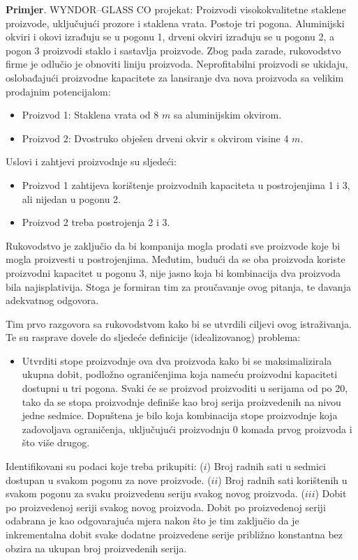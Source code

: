 \documentclass[a4paper, utf8, 11pt, colorlinks]{article}
\begin{document}
\textbf{Primjer}. WYNDOR--GLASS CO projekat: Proizvodi visokokvalitetne staklene proizvode, uključujući prozore i staklena vrata. Postoje tri pogona. Aluminijski okviri i okovi izrađuju se u pogonu 1, drveni okviri izrađuju se u pogonu 2, a pogon 3 proizvodi staklo i sastavlja proizvode.
Zbog pada zarade, rukovodstvo firme je odlučio je obnoviti liniju proizvoda. Neprofitabilni proizvodi se ukidaju, oslobađajući proizvodne kapacitete za lansiranje dva nova proizvoda sa velikim prodajnim potencijalom:
\begin{itemize}
    \item Proizvod 1: Staklena vrata od 8 $m$ sa aluminijskim okvirom.
    \item Proizvod 2: Dvostruko obješen drveni okvir s okvirom visine 4 $m$.
\end{itemize}
Uslovi i zahtjevi proizvodnje su sljedeći:
\begin{itemize}
    \item Proizvod 1 zahtijeva   korištenje proizvodnih kapaciteta u postrojenjima 1 i 3, ali nijedan u pogonu 2. 
    \item Proizvod 2 treba   postrojenja 2 i 3. 
\end{itemize}
    Rukovodstvo je zaključio da bi kompanija mogla prodati sve proizvode koje bi mogla proizvesti u postrojenjima. Međutim, budući da se oba proizvoda koriste proizvodni kapacitet u pogonu 3, nije jasno koja bi kombinacija dva proizvoda bila najisplativija. Stoga je formiran tim za proučavanje ovog pitanja, te davanja adekvatnog odgovora.

Tim prvo razgovora sa rukovodstvom kako bi se utvrdili ciljevi ovog istraživanja. Te su rasprave dovele do sljedeće definicije (idealizovanog) problema:
\begin{itemize}
    \item Utvrditi  stope proizvodnje  ova dva proizvoda kako bi se maksimalizirala ukupna dobit, podložno ograničenjima koja nameću   proizvodni kapaciteti dostupni u tri pogona. Svaki će se proizvod proizvoditi u serijama od po 20, tako da se stopa proizvodnje definiše kao broj serija proizvedenih na nivou jedne sedmice. Dopuštena je bilo koja kombinacija stope proizvodnje koja zadovoljava   ograničenja, uključujući proizvodnju 0 komada prvog proizvoda i što  više   drugog. 
\end{itemize}

Identifikovani su podaci koje treba prikupiti: 
($i$) Broj radnih sati u sedmici dostupan u svakom pogonu za nove proizvode.  
($ii$) Broj radnih sati korištenih u svakom pogonu za svaku proizvedenu seriju svakog novog proizvoda.
($iii$) Dobit po proizvedenoj seriji svakog novog proizvoda. Dobit po proizvedenoj seriji odabrana je kao odgovarajuća mjera nakon što je tim zaključio da je inkrementalna dobit svake dodatne proizvedene serije   približno konstantna bez obzira na ukupan broj proizvedenih serija.
\end{document}
